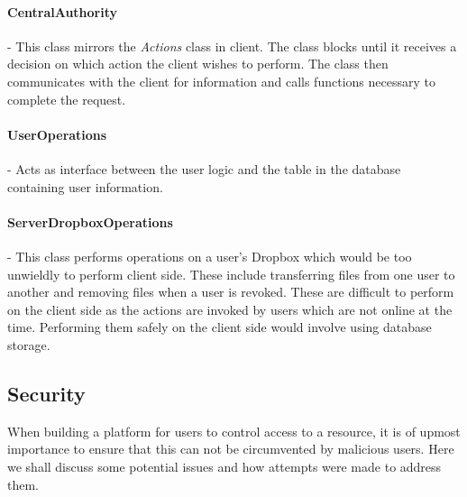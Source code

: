\documentclass[12pt, titlepage]{article}
\begin{document}
\paragraph*{CentralAuthority} - This class mirrors the \textit{Actions} class in client. The class blocks until it receives a decision on which action the client wishes to perform. The class then communicates with the client for information and calls functions necessary to complete the request.
\paragraph*{UserOperations} - Acts as interface between the user logic and the table in the database containing user information.

\paragraph*{ServerDropboxOperations} - This class performs operations on a user's Dropbox which would be too unwieldly to perform client side. These include transferring files from one user to another and removing files when a user is revoked. These are difficult to perform on the client side as the actions are invoked by users which are not online at the time. Performing them safely on the client side would involve using database storage.



\subsection{Security}
When building a platform for users to control access to a resource, it is of upmost importance to ensure that this can not be circumvented by malicious users. Here we shall discuss some potential issues and how attempts were made to address them.
\end{document}
